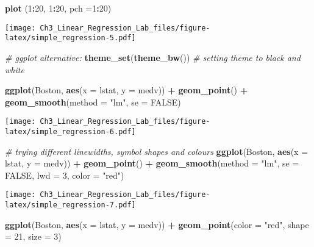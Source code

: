 \documentclass[]{article}
\newenvironment{Shaded}{\begin{snugshade}}{\end{snugshade}}
\newcommand{\CommentTok}[1]{\textcolor[rgb]{0.56,0.35,0.01}{\textit{#1}}}
\newcommand{\DataTypeTok}[1]{\textcolor[rgb]{0.13,0.29,0.53}{#1}}
\newcommand{\DecValTok}[1]{\textcolor[rgb]{0.00,0.00,0.81}{#1}}
\newcommand{\KeywordTok}[1]{\textcolor[rgb]{0.13,0.29,0.53}{\textbf{#1}}}
\newcommand{\NormalTok}[1]{#1}
\newcommand{\OperatorTok}[1]{\textcolor[rgb]{0.81,0.36,0.00}{\textbf{#1}}}
\newcommand{\OtherTok}[1]{\textcolor[rgb]{0.56,0.35,0.01}{#1}}
\newcommand{\StringTok}[1]{\textcolor[rgb]{0.31,0.60,0.02}{#1}}
\begin{document}
\begin{Shaded}
\begin{Highlighting}[]
\KeywordTok{plot}\NormalTok{ (}\DecValTok{1}\OperatorTok{:}\DecValTok{20}\NormalTok{, }\DecValTok{1}\OperatorTok{:}\DecValTok{20}\NormalTok{, }\DataTypeTok{pch =}\DecValTok{1}\OperatorTok{:}\DecValTok{20}\NormalTok{)}
\end{Highlighting}
\end{Shaded}

\texttt{[image: Ch3\_Linear\_Regression\_Lab\_files/figure-latex/simple\_regression-5.pdf]}

\begin{Shaded}
\begin{Highlighting}[]
\CommentTok{# ggplot alternative:}
\KeywordTok{theme_set}\NormalTok{(}\KeywordTok{theme_bw}\NormalTok{()) }\CommentTok{# setting theme to black and white}

\KeywordTok{ggplot}\NormalTok{(Boston, }\KeywordTok{aes}\NormalTok{(}\DataTypeTok{x =}\NormalTok{ lstat, }\DataTypeTok{y =}\NormalTok{ medv)) }\OperatorTok{+}
\StringTok{  }\KeywordTok{geom_point}\NormalTok{() }\OperatorTok{+}
\StringTok{  }\KeywordTok{geom_smooth}\NormalTok{(}\DataTypeTok{method =} \StringTok{"lm"}\NormalTok{, }\DataTypeTok{se =} \OtherTok{FALSE}\NormalTok{)}
\end{Highlighting}
\end{Shaded}

\texttt{[image: Ch3\_Linear\_Regression\_Lab\_files/figure-latex/simple\_regression-6.pdf]}

\begin{Shaded}
\begin{Highlighting}[]
\CommentTok{# trying different linewidths, symbol shapes and colours}
\KeywordTok{ggplot}\NormalTok{(Boston, }\KeywordTok{aes}\NormalTok{(}\DataTypeTok{x =}\NormalTok{ lstat, }\DataTypeTok{y =}\NormalTok{ medv)) }\OperatorTok{+}
\StringTok{  }\KeywordTok{geom_point}\NormalTok{() }\OperatorTok{+}
\StringTok{  }\KeywordTok{geom_smooth}\NormalTok{(}\DataTypeTok{method =} \StringTok{"lm"}\NormalTok{, }\DataTypeTok{se =} \OtherTok{FALSE}\NormalTok{, }\DataTypeTok{lwd =} \DecValTok{3}\NormalTok{, }\DataTypeTok{color =} \StringTok{"red"}\NormalTok{)}
\end{Highlighting}
\end{Shaded}

\texttt{[image: Ch3\_Linear\_Regression\_Lab\_files/figure-latex/simple\_regression-7.pdf]}

\begin{Shaded}
\begin{Highlighting}[]
\KeywordTok{ggplot}\NormalTok{(Boston, }\KeywordTok{aes}\NormalTok{(}\DataTypeTok{x =}\NormalTok{ lstat, }\DataTypeTok{y =}\NormalTok{ medv)) }\OperatorTok{+}
\StringTok{  }\KeywordTok{geom_point}\NormalTok{(}\DataTypeTok{color =} \StringTok{"red"}\NormalTok{, }\DataTypeTok{shape =} \DecValTok{21}\NormalTok{, }\DataTypeTok{size =} \DecValTok{3}\NormalTok{)}
\end{Highlighting}
\end{Shaded}
\end{document}
